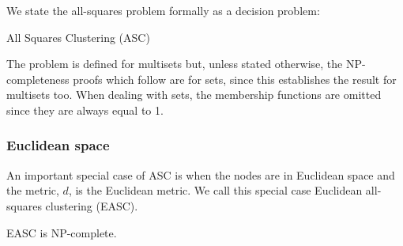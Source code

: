 We state the all-squares problem formally as a decision problem:
\begin{problem}{All Squares Clustering (ASC)}
    
\end{problem}

The problem is defined for multisets but, unless stated otherwise, the
NP-completeness proofs which follow are for sets, since this establishes the
result for multisets too.  When dealing with sets, the membership functions
are omitted since they are always equal to 1.


\subsubsection{Euclidean space}
\label{sec:euclidean-space}

An important special case of ASC is when the nodes are in Euclidean space and
the metric, $d$, is the Euclidean metric.  We call this special case Euclidean
all-squares clustering (EASC).

\begin{thm}
  EASC is NP-complete.
\end{thm}

